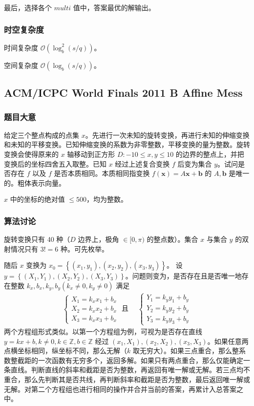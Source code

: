 				最后，选择各个 $multi$ 值中，答案最优的解输出。 
			\subsubsection{时空复杂度}
				时间复杂度 $\mathcal{O}\left(\log_b^2 ( s/q)\right)$。
					
				空间复杂度 $\mathcal{O}\left(\log_b ( s/q)\right)$。
		\newpage
		\subsection{ACM/ICPC World Finals 2011 B Affine Mess}
			\subsubsection{题目大意}
				给定三个整点构成的点集 $x$。先进行一次未知的旋转变换，再进行未知的伸缩变换和未知的平移变换。已知伸缩变换的系数为非零整数，平移变换的量为整数。旋转变换会使得原来的 $x$ 轴移动到正方形
				$
						D : -10\le x,y\le 10
				$
				的边界的整点上，并把变换后的坐标四舍五入取整。已知 $x$ 经过上述复合变换 $f$ 后变为集合 $y$。试问是否存在 $f$ 以及 $f$ 是否本质相同。本质相同指变换 $ f(\mathbf{x}) = A \mathbf{x} + \mathbf{b}$ 的 $A,\mathbf{b}$ 是唯一的。粗体表示向量。
					
				$x$ 中的坐标的绝对值 $\le 500$，均为整数。
			\subsubsection{算法讨论}
				旋转变换只有 40 种（$D$ 边界上，极角 $\in [0,\pi)$ 的整点数）。集合 $x$ 与集合 $y$ 的双射情况只有 $3! = 6$ 种。可先枚举。
				
				随后 $x$ 变换为 $x_0 = \left\{\left(x_1,y_1\right),\left(x_2,y_2\right),\left(x_3,y_3\right)\right\}$。
				设  $y = \left\{\left(X_1,Y_1\right),\left(X_2,Y_2\right),\left(X_3,Y_3\right)\right\}$。问题则变为，是否存在且是否唯一地存在整数 
				$k_x,b_x,k_y,b_y(k_x \ne 0, k_y \ne 0)$ 满足
				\begin{align}
					\begin{cases}
						X_1 = k_x x_1 + b_x\\
						X_2 = k_x x_2 + b_x\\
						X_3 = k_x x_3 + b_x
					\end{cases}
					\text{ 且 } \,\,\,\,\,\,
					\begin{cases}
						Y_1 = k_y y_1 + b_y\\
						Y_2 = k_y y_2 + b_y\\
						Y_3 = k_y y_3 + b_y
					\end{cases}
				\end{align}
				 两个方程组形式类似。以第一个方程组为例，可视为是否存在直线 $y=kx+b, k\ne 0, k\in \mathbb{Z},b \in \mathbb{Z}$ 经过 $(x_1,X_1), (x_2,X_2), (x_3,X_3)$。如果任意两点横坐标相同，纵坐标不同，那么无解（$k$ 取无穷大）。如果三点重合，那么整系数整截距的一次函数有无穷多个，返回多解。如果只有两点重合，那么仅能确定一条直线。判断直线的斜率和截距是否为整数，再返回有唯一解或无解。若三点均不重合，那么先判断其是否共线，再判断斜率和截距是否为整数，最后返回唯一解或无解。对第二个方程组也进行相同的操作并合并当前的答案，再累计入总答案之中。
